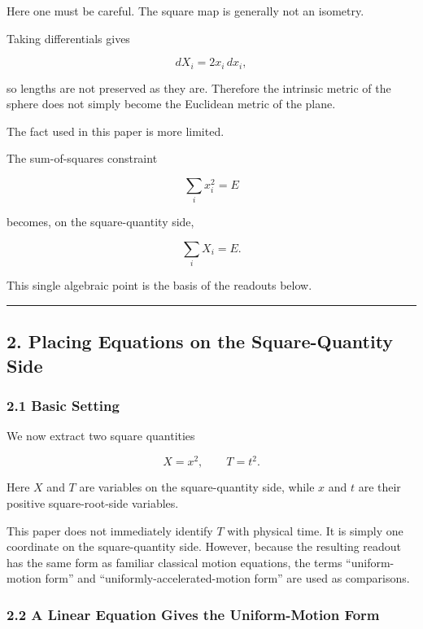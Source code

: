 \documentclass[
]{ltjsarticle}
\begin{document}
Here one must be careful. The square map is generally not an isometry.

Taking differentials gives

\[
dX_i=2x_i\,dx_i,
\]

so lengths are not preserved as they are. Therefore the intrinsic metric
of the sphere does not simply become the Euclidean metric of the plane.

The fact used in this paper is more limited.

The sum-of-squares constraint

\[
\sum_i x_i^2=E
\]

becomes, on the square-quantity side,

\[
\sum_i X_i=E.
\]

This single algebraic point is the basis of the readouts below.

\begin{center}\rule{0.5\linewidth}{0.5pt}\end{center}

\subsection{2. Placing Equations on the Square-Quantity
Side}\label{placing-equations-on-the-square-quantity-side}

\subsubsection{2.1 Basic Setting}\label{basic-setting}

We now extract two square quantities

\[
X=x^2,\qquad T=t^2.
\]

Here \(X\) and \(T\) are variables on the square-quantity side, while
\(x\) and \(t\) are their positive square-root-side variables.

This paper does not immediately identify \(T\) with physical time. It is
simply one coordinate on the square-quantity side. However, because the
resulting readout has the same form as familiar classical motion
equations, the terms ``uniform-motion form'' and
``uniformly-accelerated-motion form'' are used as comparisons.

\subsubsection{2.2 A Linear Equation Gives the Uniform-Motion
Form}\label{a-linear-equation-gives-the-uniform-motion-form}
\end{document}
